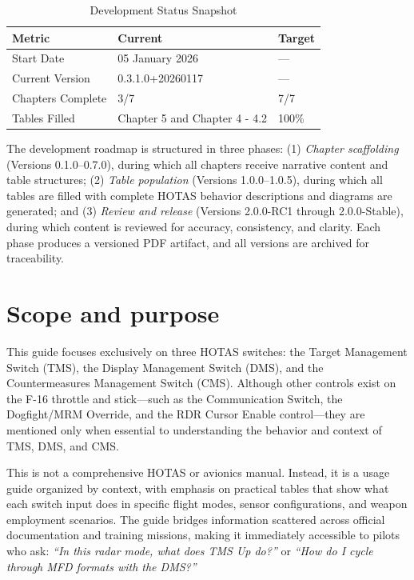 \documentclass[11pt, a4paper, twoside]{report}
\newcommand{\docversion}{0.3.1.0}
\newcommand{\docbuild}{20260117}
\newcommand{\docstartdate}{05 January 2026}
\newcommand{\chapterscompletedof}{3/7}
\newcommand{\tablesfilledpct}{Chapter 5 and Chapter 4 - 4.2}
\newcommand{\fulldocversion}{\docversion+\docbuild}
\begin{document}
\begin{table}[h]
\centering
\caption{Development Status Snapshot}
\begin{tabular}{L{3.2cm} L{2.5cm} L{2.5cm}}
\toprule
\textbf{Metric} & \textbf{Current} & \textbf{Target} \\
\midrule
Start Date & \docstartdate & --- \\
Current Version & \fulldocversion & --- \\
Chapters Complete & \chapterscompletedof & 7/7 \\
Tables Filled & \tablesfilledpct & 100\% \\
\bottomrule
\end{tabular}
\end{table}

The development roadmap is structured in three phases: (1) \emph{Chapter scaffolding} (Versions 0.1.0--0.7.0), during which all chapters receive narrative content and table structures; (2) \emph{Table population} (Versions 1.0.0--1.0.5), during which all tables are filled with complete HOTAS behavior descriptions and diagrams are generated; and (3) \emph{Review and release} (Versions 2.0.0-RC1 through 2.0.0-Stable), during which content is reviewed for accuracy, consistency, and clarity. Each phase produces a versioned PDF artifact, and all versions are archived for traceability.

\section{Scope and purpose}
\label{sec:C1-S2}

This guide focuses exclusively on three HOTAS switches: the Target Management Switch (TMS), the Display Management Switch (DMS), and the Countermeasures Management Switch (CMS). Although other controls exist on the F-16 throttle and stick---such as the Communication Switch, the Dogfight/MRM Override, and the RDR Cursor Enable control---they are mentioned only when essential to understanding the behavior and context of TMS, DMS, and CMS.

This is not a comprehensive HOTAS or avionics manual. Instead, it is a usage guide organized by context, with emphasis on practical tables that show what each switch input does in specific flight modes, sensor configurations, and weapon employment scenarios. The guide bridges information scattered across official documentation and training missions, making it immediately accessible to pilots who ask: \emph{``In this radar mode, what does TMS Up do?''} or \emph{``How do I cycle through MFD formats with the DMS?''}
\end{document}
